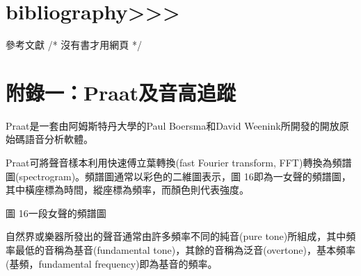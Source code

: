 \documentclass[12pt,a4paper,oneside]{report}
\begin{document}
\chapter{bibliography>>>}
參考文獻   /* 沒有書才用網頁 */

\appendix
\chapter{附錄一：Praat及音高追蹤}

Praat是一套由阿姆斯特丹大學的Paul Boersma和David Weenink所開發的開放原始碼語音分析軟體。

Praat可將聲音樣本利用快速傅立葉轉換(fast Fourier transform, FFT)轉換為頻譜圖(spectrogram)。頻譜圖通常以彩色的二維圖表示，圖 16即為一女聲的頻譜圖，其中橫座標為時間，縱座標為頻率，而顏色則代表強度。



圖 16一段女聲的頻譜圖


自然界或樂器所發出的聲音通常由許多頻率不同的純音(pure tone)所組成，其中頻率最低的音稱為基音(fundamental tone)，其餘的音稱為泛音(overtone)，基本頻率(基頻，fundamental frequency)即為基音的頻率。
\end{document}

